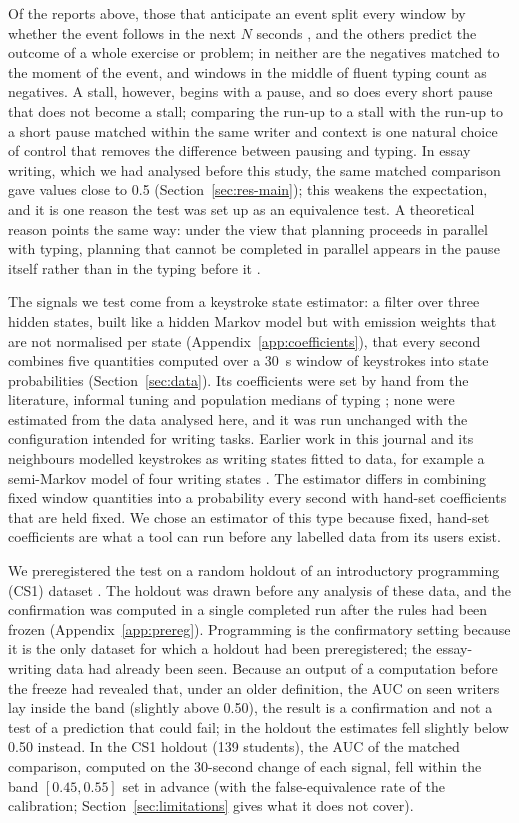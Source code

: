Of the reports above, those that anticipate an event split every
window by whether the event follows in the next $N$ seconds \cite{barron2026tutortrace}, and the others predict the
outcome of a whole exercise or problem; in neither are the negatives matched to the moment of the event, and windows in
the middle of fluent typing count as negatives. A stall, however, begins with a
pause, and so does every short pause that does not become a stall; comparing the run-up to a stall with the run-up to a
short pause matched within the same writer and context is one natural choice of control that removes the difference
between pausing and typing. In essay writing, which we had analysed before this study, the same matched comparison gave
values close to 0.5 (Section~\ref{sec:res-main}); this weakens the expectation,
and it is one reason the test was set up as an equivalence test. A theoretical reason points the same way: under the
view that planning proceeds in parallel with typing, planning that cannot be completed in parallel appears in the pause
itself rather than in the typing before it \cite{roeser2025typing,olive2002concurrent}.

The signals we test come from a keystroke state estimator: a filter over three hidden states, built like a hidden Markov
model but with emission weights that are not normalised per state (Appendix~\ref{app:coefficients}), that every second
combines five quantities computed over a 30~s window of keystrokes into state probabilities (Section~\ref{sec:data}).
Its coefficients were set by hand from the literature, informal tuning and population medians of typing
\cite{dhakal2018typing}; none were estimated from the data analysed here, and it was run unchanged with the
configuration intended for writing tasks. Earlier work in this journal and its neighbours modelled keystrokes as
writing states fitted to data, for example a semi-Markov model of four writing states
\cite{guo2020scenario,guo2018basic}. The estimator differs in combining fixed window quantities into a probability every
second with hand-set coefficients that are held fixed. We chose an estimator of this type because fixed, hand-set
coefficients are what a tool can run before any labelled data from its users exist.

We preregistered the test on a random holdout of an introductory programming (CS1) dataset \cite{edwards2023cs1}. The
holdout was drawn before any analysis of these data, and the confirmation was computed in a single completed run after
the rules had been frozen (Appendix~\ref{app:prereg}). Programming is the confirmatory setting because it is the only
dataset for which a holdout had been preregistered; the essay-writing data had already been seen. Because an output of a
computation before the freeze had revealed that, under an older definition, the AUC on seen writers lay inside the band
(slightly above 0.50), the result is a confirmation and not a test of a prediction that could fail; in the holdout the
estimates fell slightly below 0.50 instead. In the CS1 holdout (139 students), the AUC of the matched comparison,
computed on the 30-second change of each signal, fell within the band $[0.45, 0.55]$ set in advance (with the false-equivalence rate of the calibration;
Section~\ref{sec:limitations} gives what it does not cover).

